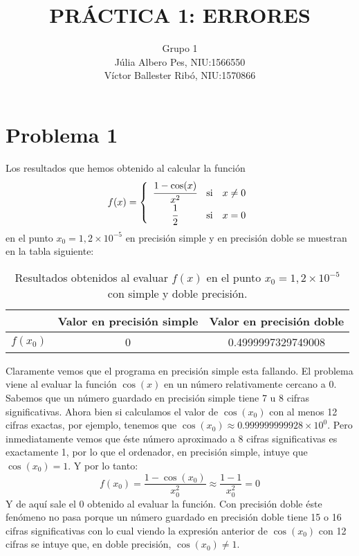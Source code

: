 \documentclass[a4paper]{article}
\title{\bfseries\Large PRÁCTICA 1: ERRORES}
\author{Grupo 1\\Júlia Albero Pes, NIU:1566550\\ Víctor Ballester Ribó, NIU:1570866}
\date{\parbox{\linewidth}{\centering
  Métodos numéricos\endgraf
  Grado en Matemáticas\endgraf
  Universitat Autònoma de Barcelona\endgraf
  15 de Marzo de 2021}}
\begin{document}
\maketitle
\newpage
\section*{Problema 1}
Los resultados que hemos obtenido al calcular la función \begin{equation}
    f(x)=\left\{\begin{array}{ccc}
        \cfrac{1-\cos(x)}{x^2} & \text{si} & x\ne 0 \\
        \cfrac{1}{2} & \text{si} & x=0 
    \end{array}\right.
    \label{f}
\end{equation} en el punto $x_0=1,2\times10^{-5}$ en precisión simple y en precisión doble se muestran en la tabla siguiente:\par
\begin{table}[ht]
    \centering
    \begin{tabular}{|c|c|c|}
        \hline
         & Valor en precisión simple & Valor en precisión doble \\
         \hline
         $f(x_0)$ & 0 & 0.4999997329749008 \\
         \hline
    \end{tabular}
    \caption{Resultados obtenidos al evaluar $f(x)$ en el punto $x_0=1,2\times10^{-5}$ con simple y doble precisión.}
    \label{tab:1}
\end{table}
Claramente vemos que el programa en precisión simple esta fallando. El problema viene al evaluar la función $\cos(x)$ en un número relativamente cercano a 0. Sabemos que un número guardado en precisión simple tiene 7 u 8 cifras significativas. Ahora bien si calculamos el valor de $\cos(x_0)$ con al menos 12 cifras exactas, por ejemplo, tenemos que $\cos(x_0)\approx 0.999999999928\times 10^0$. Pero inmediatamente vemos que éste número aproximado a 8 cifras significativas es exactamente 1, por lo que el ordenador, en precisión simple, intuye que $\cos(x_0)=1$. Y por lo tanto: 
\begin{equation*}
    f(x_0)=\frac{1-\cos(x_0)}{x_0^2}\approx\frac{1-1}{x_0^2}=0
\end{equation*}
Y de aquí sale el 0 obtenido al evaluar la función. Con precisión doble éste fenómeno no pasa porque un número guardado en precisión doble tiene 15 o 16 cifras significativas con lo cual viendo la expresión anterior de $\cos(x_0)$ con 12 cifras se intuye que, en doble precisión, $\cos(x_0)\ne 1$.\par
\end{document}
